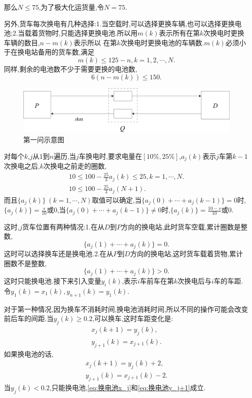 \documentclass[12pt,a4paper,oneside]{ctexart}
\begin{document}
{\color{red}那么$N\leqslant 75$,为了极大化运货量,令$N=75$.}

另外,货车每次换电有几种选择:1.当空载时,可以选择更换车辆,也可以选择更换电池;2.当载着货物时,只能选择更换电池.所以用$m(k)$表示所有在第$k$次换电时更换车辆的数目,$n-m(k)$表示所以
在第$k$次换电时更换电池的车辆数.$m(k)$必须小于在换电站备用的货车数,满足
\begin{equation}
  m(k)\leqslant 125-n,k=1,2,\cdots,N.
\end{equation}
同样,剩余的电池数不少于需要更换的电池数,
\begin{equation}
  6(n-m(k))\leqslant 150.
\end{equation}

\begin{figure}[H]
  \centering
  \includegraphics[scale=0.25]{资源 1.pdf}
  \caption{第一问示意图}
\end{figure}

对每个$k$,$j$从1到$n$遍历,当$j$车换电时,要求电量在$[10\%,25\%]$,$a_j(k)$表示$j$车第$k-1$次换电之后,$k$次换电之前走的圈数,
\begin{gather}
  10\leqslant 100-\frac{25}{3}a_j(k)\leqslant 25,k=1,\cdots,N.\\
  10\leqslant 100-\frac{25}{3}a_j(N+1).
\end{gather}
而且$\{a_j(k)\}\ (k=1,\cdots,N)$取值可以确定,当$\{a_j(0)+\cdots+a_j(k-1)\}=0$时,$\{a_j(k)\}=\frac{s}{10}$或0,当$\{a_j(0)+\cdots+a_j(k-1)\}\neq 0$时,$\{a_j(k)\}=\frac{10-s}{10}$或0.

这时,$j$货车位置有两种情况:1.在从$D$到$P$方向的换电站,此时货车空载,累计圈数是整数,
\begin{equation}
  \{a_j(1)+\cdots+a_j(k)\}=0.
\end{equation}
这时可以选择换车还是换电池.2.在从$P$到$D$方向的换电站,这时货车载着货物,累计圈数不是整数,
\begin{equation}
  \{a_j(1)+\cdots+a_j(k)\}>0.
\end{equation}
这时只能换电池.接下来引入变量$y_i(k)$,表示$i$车前车在第$k$次换电后与$i$车的车距.令$y_1(k)=x_1(k),y_{n+1}(k)=y_1(k)$.

对于第一种情况,因为换车不消耗时间,换电池消耗时间,所以不同的操作可能会改变前后车的间距.当$y_j(k)\geqslant 0.2$,可以换车,这时车距变化是:
\begin{gather}
  x_j(k+1)=y_j(k),\\
  y_{j+1}(k)=x_{j+1}(k).
\end{gather}
如果换电池的话,
\begin{gather}
  x_j(k+1)=y_j(k)+2,\label{eq:换电池x_j}\\
  y_{j+1}(k)=x_{j+1}(k)-2.\label{eq:换电池y_j+1}
\end{gather}
当$y_j(k)<0.2$,只能换电池,\eqref{eq:换电池x_j}和\eqref{eq:换电池y_j+1}成立.
\end{document}
